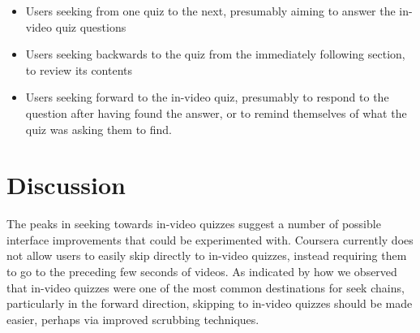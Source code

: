 \documentclass{sigchi}
\begin{document}
\begin{itemize}
\item Users seeking from one quiz to the next, presumably aiming to answer the in-video quiz questions
\item Users seeking backwards to the quiz from the immediately following section, to review its contents
\item Users seeking forward to the in-video quiz, presumably to respond to the question after having found the answer, or to remind themselves of what the quiz was asking them to find.
\end{itemize}

\section{Discussion}

The peaks in seeking towards in-video quizzes suggest a number of possible interface improvements that could be experimented with. Coursera currently does not allow users to easily skip directly to in-video quizzes, instead requiring them to go to the preceding few seconds of videos. As indicated by how we observed that in-video quizzes were one of the most common destinations for seek chains, particularly in the forward direction, skipping to in-video quizzes should  be made easier, perhaps via improved scrubbing techniques. %

\end{document}

